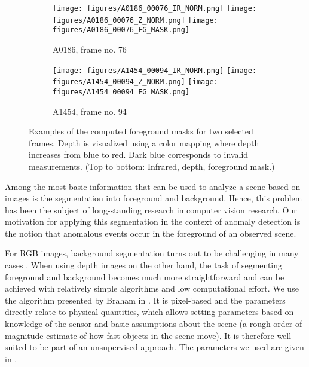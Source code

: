 \documentclass[10pt,twocolumn,letterpaper]{article}
\begin{document}
\begin{figure}[tb]
  \centering
  \begin{subfigure}{0.5\linewidth}
    \texttt{[image: figures/A0186\_00076\_IR\_NORM.png]}
    \texttt{[image: figures/A0186\_00076\_Z\_NORM.png]}
    \texttt{[image: figures/A0186\_00076\_FG\_MASK.png]}
    \caption{A0186, frame no. 76}
    \label{fig:fg_mask_example_a}
  \end{subfigure}
  \begin{subfigure}{0.45\linewidth}
    \texttt{[image: figures/A1454\_00094\_IR\_NORM.png]}
    \texttt{[image: figures/A1454\_00094\_Z\_NORM.png]}
    \texttt{[image: figures/A1454\_00094\_FG\_MASK.png]}
    \caption{A1454, frame no. 94}
    \label{fig:fg_mask_example_b}
  \end{subfigure}
  \caption{Examples of the computed foreground masks for two selected frames. Depth is visualized using a color mapping where depth increases from blue to red. Dark blue corresponds to invalid measurements. (Top to bottom: Infrared, depth, foreground mask.)}
  \label{fig:fg_mask_examples}
\end{figure}

Among the most basic information that can be used to analyze a scene based on images is the segmentation into foreground and background. Hence, this problem has been the subject of long-standing research in computer vision research. Our motivation for applying this segmentation in the context of anomaly detection is the notion that anomalous events occur in the foreground of an observed scene.

For RGB images, background segmentation turns out to be challenging in many cases \cite{bgs_review}. When using depth images on the other hand, the task of segmenting foreground and background becomes much more straightforward and can be achieved with relatively simple algorithms and low computational effort. We use the algorithm presented by Braham \etal in \cite{physically_based_BGS}. It is pixel-based and the parameters directly relate to physical quantities, which allows setting parameters based on knowledge of the sensor and basic assumptions about the scene (\eg a rough order of magnitude estimate of how fast objects in the scene move). It is therefore well-suited to be part of an unsupervised approach. The parameters we used are given in .
\end{document}
